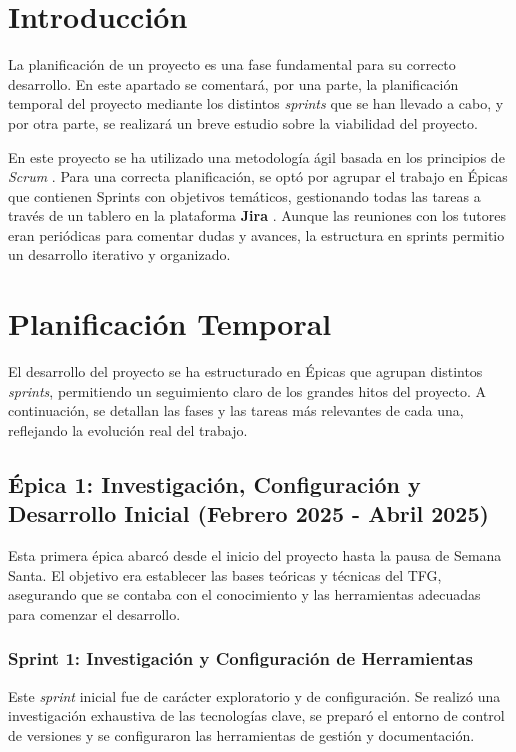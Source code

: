 \label{apendice:plan_proyecto}

\section{Introducción}
\label{sec:plan_intro}

La planificación de un proyecto es una fase fundamental para su correcto desarrollo. En este apartado se comentará, por una parte, la planificación temporal del proyecto mediante los distintos \textit{sprints} que se han llevado a cabo, y por otra parte, se realizará un breve estudio sobre la viabilidad del proyecto.

En este proyecto se ha utilizado una metodología ágil basada en los principios de \textit{Scrum} \cite{trigas2012metodologia}. Para una correcta planificación, se optó por agrupar el trabajo en Épicas que contienen Sprints con objetivos temáticos, gestionando todas las tareas a través de un tablero en la plataforma \textbf{Jira} \cite{atlassian_jira}. Aunque las reuniones con los tutores eran periódicas para comentar dudas y avances, la estructura en sprints permitio un desarrollo iterativo y organizado.

\section{Planificación Temporal}
\label{sec:plan_temporal}
El desarrollo del proyecto se ha estructurado en Épicas que agrupan distintos \textit{sprints}, permitiendo un seguimiento claro de los grandes hitos del proyecto. A continuación, se detallan las fases y las tareas más relevantes de cada una, reflejando la evolución real del trabajo.

\subsection{Épica 1: Investigación, Configuración y Desarrollo Inicial (Febrero 2025 - Abril 2025)}
\label{epic:1}
Esta primera épica abarcó desde el inicio del proyecto hasta la pausa de Semana Santa. El objetivo era establecer las bases teóricas y técnicas del TFG, asegurando que se contaba con el conocimiento y las herramientas adecuadas para comenzar el desarrollo.

\subsubsection{Sprint 1: Investigación y Configuración de Herramientas}
Este \textit{sprint} inicial fue de carácter exploratorio y de configuración. Se realizó una investigación exhaustiva de las tecnologías clave, se preparó el entorno de control de versiones y se configuraron las herramientas de gestión y documentación.

